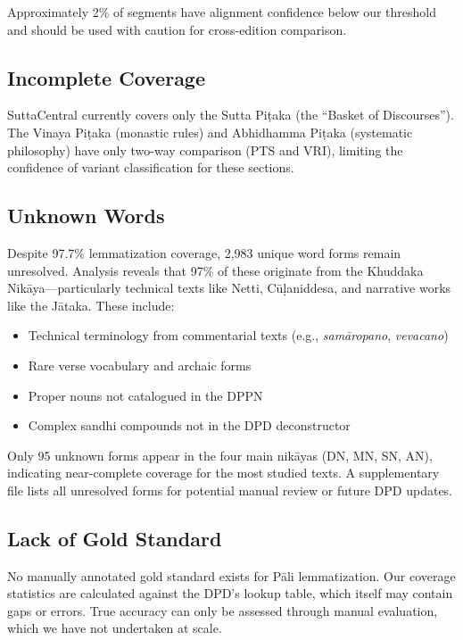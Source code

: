 \documentclass[12pt]{article}
\begin{document}
Approximately 2\% of segments have alignment confidence below our threshold and should be used with caution for cross-edition comparison.

\subsection{Incomplete Coverage}

SuttaCentral currently covers only the Sutta Piṭaka (the ``Basket of Discourses''). The Vinaya Piṭaka (monastic rules) and Abhidhamma Piṭaka (systematic philosophy) have only two-way comparison (PTS and VRI), limiting the confidence of variant classification for these sections.

\subsection{Unknown Words}

Despite 97.7\% lemmatization coverage, 2,983 unique word forms remain unresolved. Analysis reveals that 97\% of these originate from the Khuddaka Nikāya---particularly technical texts like Netti, Cūḷaniddesa, and narrative works like the Jātaka. These include:

\begin{itemize}
\item Technical terminology from commentarial texts (e.g., \emph{samāropano}, \emph{vevacano})
\item Rare verse vocabulary and archaic forms
\item Proper nouns not catalogued in the DPPN
\item Complex sandhi compounds not in the DPD deconstructor
\end{itemize}

Only 95 unknown forms appear in the four main nikāyas (DN, MN, SN, AN), indicating near-complete coverage for the most studied texts. A supplementary file lists all unresolved forms for potential manual review or future DPD updates.

\subsection{Lack of Gold Standard}

No manually annotated gold standard exists for Pāli lemmatization. Our coverage statistics are calculated against the DPD's lookup table, which itself may contain gaps or errors. True accuracy can only be assessed through manual evaluation, which we have not undertaken at scale.
\end{document}
